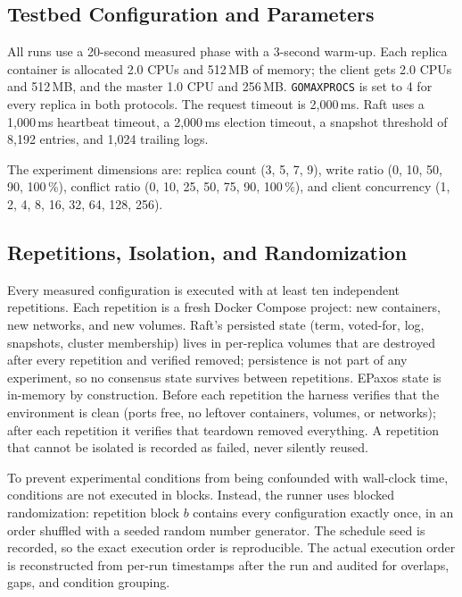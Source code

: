 %

\subsection{Testbed Configuration and Parameters}

All runs use a 20-second measured phase with a 3-second warm-up. Each
replica container is allocated 2.0 CPUs and 512\,MB of memory; the client
gets 2.0 CPUs and 512\,MB, and the master 1.0 CPU and 256\,MB.
\texttt{GOMAXPROCS} is set to 4 for every replica in both protocols. The
request timeout is 2{,}000\,ms. Raft uses a 1{,}000\,ms heartbeat timeout, a
2{,}000\,ms election timeout, a snapshot threshold of 8{,}192 entries, and
1{,}024 trailing logs.

The experiment dimensions are: replica count (3, 5, 7, 9), write ratio
(0, 10, 50, 90, 100\,\%), conflict ratio (0, 10, 25, 50, 75, 90, 100\,\%),
and client concurrency (1, 2, 4, 8, 16, 32, 64, 128, 256).

\subsection{Repetitions, Isolation, and Randomization}

Every measured configuration is executed with at least ten independent
repetitions. Each repetition is a fresh Docker Compose project: new
containers, new networks, and new volumes. Raft's persisted state (term,
voted-for, log, snapshots, cluster membership) lives in per-replica volumes
that are destroyed after every repetition and verified removed; persistence
is not part of any experiment, so no consensus state survives between
repetitions. EPaxos state is in-memory by construction. Before each
repetition the harness verifies that the environment is clean (ports free,
no leftover containers, volumes, or networks); after each repetition it
verifies that teardown removed everything. A repetition that cannot be
isolated is recorded as failed, never silently reused.

To prevent experimental conditions from being confounded with wall-clock
time, conditions are not executed in blocks. Instead, the runner uses
blocked randomization: repetition block $b$ contains every configuration
exactly once, in an order shuffled with a seeded random number generator.
The schedule seed is recorded, so the exact execution order is reproducible.
The actual execution order is reconstructed from per-run timestamps after
the run and audited for overlaps, gaps, and condition grouping.

